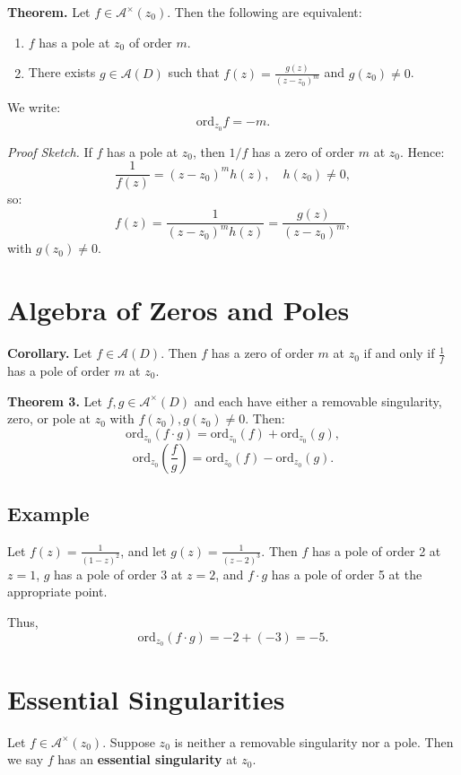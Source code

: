 \documentclass[12pt]{article}
\theoremstyle{definition} %
\theoremstyle{plain} %
\begin{document}
\textbf{Theorem.} Let $f \in \mathcal{A}^\times(z_0)$. Then the following are equivalent:
\begin{enumerate}
    \item $f$ has a pole at $z_0$ of order $m$.
    \item There exists $g \in \mathcal{A}(D)$ such that $f(z) = \frac{g(z)}{(z - z_0)^m}$ and $g(z_0) \neq 0$.
\end{enumerate}

We write:
\[
\text{ord}_{z_0} f = -m.
\]

\textit{Proof Sketch.} If $f$ has a pole at $z_0$, then $1/f$ has a zero of order $m$ at $z_0$. Hence:
\[
\frac{1}{f(z)} = (z - z_0)^m h(z), \quad h(z_0) \neq 0,
\]
so:
\[
f(z) = \frac{1}{(z - z_0)^m h(z)} = \frac{g(z)}{(z - z_0)^m},
\]
with $g(z_0) \neq 0$.

\section*{Algebra of Zeros and Poles}

\textbf{Corollary.} Let $f \in \mathcal{A}(D)$. Then $f$ has a zero of order $m$ at $z_0$ if and only if $\frac{1}{f}$ has a pole of order $m$ at $z_0$.

\textbf{Theorem 3.} Let $f, g \in \mathcal{A}^\times(D)$ and each have either a removable singularity, zero, or pole at $z_0$ with $f(z_0), g(z_0) \neq 0$. Then:
\[
\text{ord}_{z_0}(f \cdot g) = \text{ord}_{z_0}(f) + \text{ord}_{z_0}(g),
\]
\[
\text{ord}_{z_0}\left(\frac{f}{g}\right) = \text{ord}_{z_0}(f) - \text{ord}_{z_0}(g).
\]

\subsection*{Example}

Let $f(z) = \frac{1}{(1 - z)^2}$, and let $g(z) = \frac{1}{(z - 2)^3}$. Then $f$ has a pole of order 2 at $z = 1$, $g$ has a pole of order 3 at $z = 2$, and $f \cdot g$ has a pole of order 5 at the appropriate point.

Thus,
\[
\text{ord}_{z_0}(f \cdot g) = -2 + (-3) = -5.
\]

\section*{Essential Singularities}

Let $f \in \mathcal{A}^\times(z_0)$. Suppose $z_0$ is neither a removable singularity nor a pole. Then we say $f$ has an \textbf{essential singularity} at $z_0$.
\end{document}
